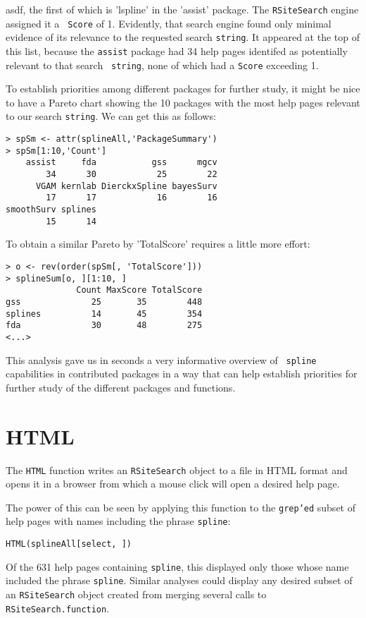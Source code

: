 asdf,
the first of which is 'lspline' in the
'assist' package.  The {\tt RSiteSearch} engine assigned it a {\tt
Score} of 1.  Evidently, that search engine found only minimal
evidence of its relevance to the requested search {\tt string}.  It
appeared at the top of this list, because the {\tt assist} package had
34 help pages identifed as potentially relevant to that search {\tt
string}, none of which had a {\tt Score} exceeding 1.

To establish priorities among different packages for further study, it
might be nice to have a Pareto chart showing the 10 packages with the
most help pages relevant to our search {\tt string}.  We can get this as
follows:
\begin{verbatim}
> spSm <- attr(splineAll,'PackageSummary')
> spSm[1:10,'Count']
    assist     fda           gss      mgcv
        34      30            25        22
      VGAM kernlab DierckxSpline bayesSurv
        17      17            16        16
smoothSurv splines
        15      14
\end{verbatim}
To obtain a similar Pareto by 'TotalScore' requires a little more
effort:
\begin{verbatim}
> o <- rev(order(spSm[, 'TotalScore']))
> splineSum[o, ][1:10, ]
              Count MaxScore TotalScore
gss              25       35        448
splines          14       45        354
fda              30       48        275
<...>
\end{verbatim}
This analysis gave us in seconds a very informative overview of {\tt
spline} capabilities in contributed \R{} packages in a way that can help
establish priorities for further study of the different packages and
functions.

\section*{HTML}
The {\tt HTML} function writes an {\tt RSiteSearch} object to a file
in HTML format and opens it in a browser from which a mouse click will
open a desired help page.

The power of this can be seen by applying this function to the
{\tt grep'ed} subset of help pages with names including the phrase
{\tt spline}:

\begin{verbatim}
HTML(splineAll[select, ])
\end{verbatim}

Of the 631 help pages containing {\tt spline}, this displayed only
those whose name included the phrase {\tt spline}.  Similar analyses
could display any desired subset of an {\tt RSiteSearch} object
created from merging several calls to {\tt RSiteSearch.function}.

